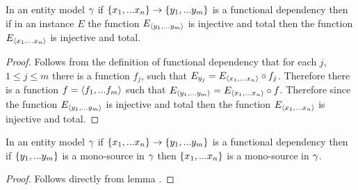 \begin{lemma}
In an entity model $\gamma$ if $\left\{x_1,...x_n\right\} \rightarrow \left\{y_1,...y_{m}\right\}$ is a functional dependency then if in an instance $E$ the function $E_{\langle y_1,...y_{m}\rangle}$ is injective and total then the function $E_{\langle x_1,...x_n\rangle}$  is injective and total.
\end{lemma}
\begin{proof}
Follows from the definition of functional dependency that for each $j$, $1 \leq j \leq m$  there is a function ${f_j}$,  such that
$E_{y_j}=E_{\langle x_1,...x_n\rangle}\circ f_j$. Therefore there is a function $f=\langle f_1,...f_m\rangle$ such that
$E_{\langle y_1,...y_m\rangle}= E_{\langle x_1,...x_n\rangle}\circ f $. Therefore since  the function $E_{\langle y_1,...y_{m}\rangle}$ is 
injective and total then the function $E_{\langle x_1,...x_n\rangle}$  is injective and total.
\end{proof}

\begin{lemma}
In an entity model $\gamma$ if $\left\{x_1,...x_n\right\} \rightarrow \left\{y_1,...y_{m}\right\}$ is a functional dependency then if 
$\left\{y_1,...y_{m}\right\}$  is a mono-source in $\gamma$ then $\left\{x_1,...x_n\right\}$ is a mono-source in $\gamma$.
\end{lemma}
\begin{proof}
Follows directly from lemma .
\end{proof}


